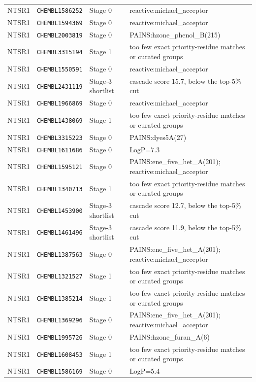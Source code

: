 {\begin{longtable}{@{}llp{}p{}@{}}
NTSR1 & \texttt{CHEMBL1586252} & Stage 0 & reactive:michael\_acceptor \\
NTSR1 & \texttt{CHEMBL1594369} & Stage 0 & reactive:michael\_acceptor \\
NTSR1 & \texttt{CHEMBL2003819} & Stage 0 & PAINS:hzone\_phenol\_B(215) \\
NTSR1 & \texttt{CHEMBL3315194} & Stage 1 & too few exact priority-residue matches or curated groups \\
NTSR1 & \texttt{CHEMBL1550591} & Stage 0 & reactive:michael\_acceptor \\
NTSR1 & \texttt{CHEMBL2431119} & Stage-3 shortlist & cascade score 15.7, below the top-5\% cut \\
NTSR1 & \texttt{CHEMBL1966869} & Stage 0 & reactive:michael\_acceptor \\
NTSR1 & \texttt{CHEMBL1438069} & Stage 1 & too few exact priority-residue matches or curated groups \\
NTSR1 & \texttt{CHEMBL3315223} & Stage 0 & PAINS:dyes5A(27) \\
NTSR1 & \texttt{CHEMBL1611686} & Stage 0 & LogP=7.3 \\
NTSR1 & \texttt{CHEMBL1595121} & Stage 0 & PAINS:ene\_five\_het\_A(201); reactive:michael\_acceptor \\
NTSR1 & \texttt{CHEMBL1340713} & Stage 1 & too few exact priority-residue matches or curated groups \\
NTSR1 & \texttt{CHEMBL1453900} & Stage-3 shortlist & cascade score 12.7, below the top-5\% cut \\
NTSR1 & \texttt{CHEMBL1461496} & Stage-3 shortlist & cascade score 11.9, below the top-5\% cut \\
NTSR1 & \texttt{CHEMBL1387563} & Stage 0 & PAINS:ene\_five\_het\_A(201); reactive:michael\_acceptor \\
NTSR1 & \texttt{CHEMBL1321527} & Stage 1 & too few exact priority-residue matches or curated groups \\
NTSR1 & \texttt{CHEMBL1385214} & Stage 1 & too few exact priority-residue matches or curated groups \\
NTSR1 & \texttt{CHEMBL1369296} & Stage 0 & PAINS:ene\_five\_het\_A(201); reactive:michael\_acceptor \\
NTSR1 & \texttt{CHEMBL1995726} & Stage 0 & PAINS:hzone\_furan\_A(6) \\
NTSR1 & \texttt{CHEMBL1608453} & Stage 1 & too few exact priority-residue matches or curated groups \\
NTSR1 & \texttt{CHEMBL1586169} & Stage 0 & LogP=5.4 \\

\end{longtable}}
